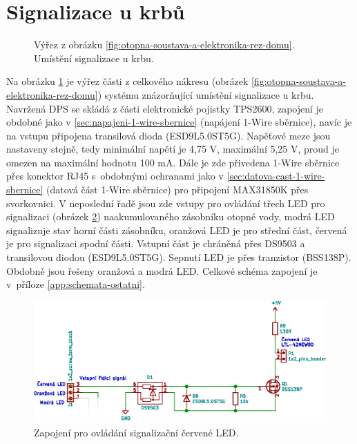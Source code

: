 \section{Signalizace u krbů}
\begin{figure}[H]
   \centering
    \def\svgwidth{0.3\columnwidth}
    
    \caption[Umístění signalizace u krbu.]{Výřez z obrázku \ref{fig:otopna-soustava-a-elektronika-rez-domu}. Umístění signalizace u krbu.}
    \label{fig:vyrez-krb-signalizace}
\end{figure}

Na obrázku \ref{fig:vyrez-krb-signalizace} je výřez části z celkového nákresu (obrázek \ref{fig:otopna-soustava-a-elektronika-rez-domu}) systému znázorňující umístění signalizace u krbu. Navržená DPS se skládá z části elektronické pojistky TPS2600, zapojení je obdobné jako v \ref{sec:napajeni-1-wire-sbernice} (napájení 1-Wire sběrnice), navíc je na vstupu připojena transilová dioda (ESD9L5.0ST5G). Napěťové meze jsou nastaveny stejně, tedy minimální napětí je 4,75 V, maximální 5,25 V, proud je omezen na maximální hodnotu 100 mA. Dále je zde přivedena 1-Wire sběrnice přes konektor RJ45 s~obdobnými ochranami jako v \ref{sec:datova-cast-1-wire-sbernice} (datová část 1-Wire sběrnice) pro připojení MAX31850K přes svorkovnici. V neposlední řadě jsou zde vstupy pro ovládání třech LED pro signalizaci (obrázek \ref{fig:led-indikace}) naakumulovaného zásobníku otopné vody, modrá LED signalizuje stav horní části zásobníku, oranžová LED je pro střední část, červená je pro signalizaci spodní části. Vstupní část je chráněná přes DS9503 a transilovou diodou (ESD9L5.0ST5G). Sepnutí LED je přes tranzistor (BSS138P). Obdobně jsou řešeny oranžová a modrá LED. Celkové schéma zapojení je v~příloze \ref{app:schemata-ostatni}.

\begin{figure}[H]
    \centering
    \includegraphics[width=\textwidth]{images/svg/kicad/led-indikace.eps}
    \caption{Zapojení pro ovládání signalizační červené LED.}
    \label{fig:led-indikace}
\end{figure}




